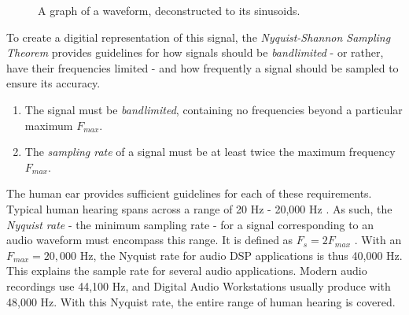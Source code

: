 \begin{figure}[h] %
\begin{center}
	\caption{A graph of a waveform, deconstructed to its sinusoids.}
\end{center}
\end{figure}

To create a digitial representation of this signal, the \textit{Nyquist-Shannon Sampling Theorem} provides guidelines for how signals should be \textit{bandlimited} - or rather, have their frequencies limited - and how frequently a signal should be sampled to ensure its accuracy.

\begin{defn}\label{def3}
\hfill
\begin{enumerate}
	\item The signal must be \textit{bandlimited}, containing no frequencies beyond a particular maximum $F_{max}$.
	\item The \textit{sampling rate} of a signal must be at least twice the maximum frequency $F_{max}$.
\end{enumerate}
\end{defn}

The human ear provides sufficient guidelines for each of these requirements. Typical human hearing spans across a range of 20 Hz - 20,000 Hz \cite{Ling_2016}. As such, the \textit{Nyquist rate} - the minimum sampling rate - for a signal corresponding to an audio waveform must encompass this range. It is defined as $F_s = 2F_{max}$ \cite{Orfanidis_1998}. With an $F_{max} = 20,000$ Hz, the Nyquist rate for audio DSP applications is thus 40,000 Hz. This explains the sample rate for several audio applications. Modern audio recordings use 44,100 Hz, and Digital Audio Workstations usually produce with 48,000 Hz. With this Nyquist rate, the entire range of human hearing is covered.

